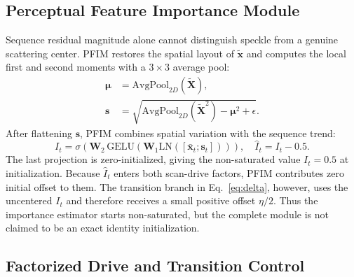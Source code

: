\documentclass[letterpaper]{article}
\begin{document}
\subsection{Perceptual Feature Importance Module}

Sequence residual magnitude alone cannot distinguish speckle from a genuine scattering center. PFIM restores the spatial layout of $\widetilde{\mathbf{x}}$ and computes the local first and second moments with a $3\times3$ average pool:
\begin{align}
  \boldsymbol{\mu}&=\mathrm{AvgPool}_{2D}(\widetilde{\mathbf{X}}),\\
  \mathbf{s}&=\sqrt{\mathrm{AvgPool}_{2D}(\widetilde{\mathbf{X}}^2)-\boldsymbol{\mu}^2+\epsilon}.
\end{align}
After flattening $\mathbf{s}$, PFIM combines spatial variation with the sequence trend:
\begin{equation}
  I_t=\sigma\!\left(\mathbf{W}_2\,\mathrm{GELU}
  \left(\mathbf{W}_1\mathrm{LN}([\bar{\mathbf{x}}_t;\mathbf{s}_t])\right)\right),
  \quad \widehat I_t=I_t-0.5.
  \label{eq:pfim}
\end{equation}
The last projection is zero-initialized, giving the non-saturated value $I_t=0.5$ at initialization. Because $\widehat I_t$ enters both scan-drive factors, PFIM contributes zero initial offset to them. The transition branch in Eq.~\ref{eq:delta}, however, uses the uncentered $I_t$ and therefore receives a small positive offset $\eta/2$. Thus the importance estimator starts non-saturated, but the complete module is not claimed to be an exact identity initialization.

\subsection{Factorized Drive and Transition Control}
\end{document}
